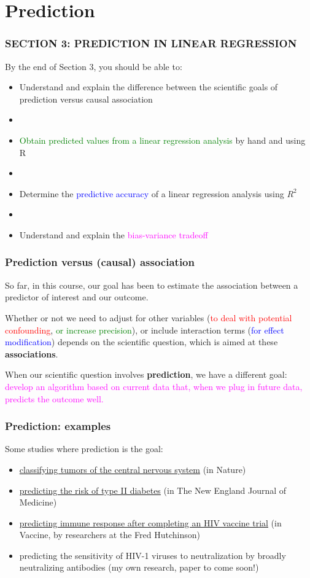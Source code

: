 \documentclass[12pt, 
hyperref={colorlinks=true, linkcolor=blue, urlcolor=cyan},dvipsnames]{beamer}
\begin{document}
\section{Prediction}
\begin{frame}
\frametitle{{\fontsize{15pt}{7.2}\selectfont SECTION 3: PREDICTION IN LINEAR REGRESSION}}

By the end of Section 3, you should be able to:
\begin{itemize}
\item Understand and explain the difference between the scientific goals of prediction versus causal association
\item[]
\item \textcolor{green}{Obtain predicted values from a linear regression analysis} by hand and using R
\item[]
\item Determine the \textcolor{blue}{predictive accuracy} of a linear regression analysis using $R^2$
\item[]
\item Understand and explain the \textcolor{magenta}{bias-variance tradeoff}
\end{itemize}
\end{frame}

\begin{frame}
\frametitle{Prediction versus (causal) association}
So far, in this course, our goal has been to estimate the association between a predictor of interest and our outcome.

Whether or not we need to adjust for other variables (\textcolor{red}{to deal with potential confounding}, \textcolor{green}{or increase precision}), or include interaction terms (\textcolor{blue}{for effect modification}) depends on the scientific question, which is aimed at these \textbf{associations}.

When our scientific question involves \textbf{prediction}, we have a different goal: \textcolor{magenta}{develop an algorithm based on current data that, when we plug in future data, predicts the outcome well.}
\end{frame}

\begin{frame}
\frametitle{Prediction: examples}
Some studies where prediction is the goal:
\begin{itemize}
\item \href{http://www.nature.com.offcampus.lib.washington.edu/articles/nature26000}{classifying tumors of the central nervous system} {\small (in Nature)}
\item \href{http://www.nejm.org.offcampus.lib.washington.edu/doi/full/10.1056/NEJMoa0804742}{predicting the risk of type II diabetes} {\small (in The New England Journal of Medicine)}
\item \href{https://www.ncbi.nlm.nih.gov/pubmed/28131393}{predicting immune response after completing an HIV vaccine trial} {\small (in Vaccine, by researchers at the Fred Hutchinson)}
\item predicting the sensitivity of HIV-1 viruses to neutralization by broadly neutralizing antibodies (my own research, paper to come soon!)
\end{itemize}
\end{frame}
\end{document}
